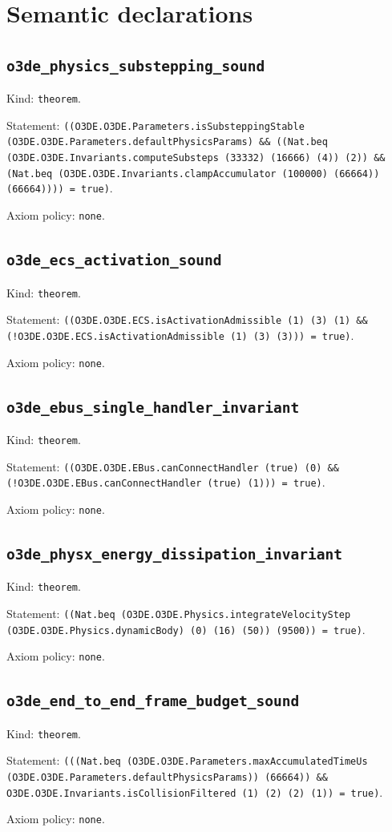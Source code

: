 \documentclass[11pt]{article}
\begin{document}
\section*{Semantic declarations}
\subsection*{\texttt{o3de\_physics\_substepping\_sound}}
\noindent Kind: \texttt{theorem}.\par
\noindent Statement: \texttt{((O3DE.O3DE.Parameters.isSubsteppingStable (O3DE.O3DE.Parameters.defaultPhysicsParams) \&\& ((Nat.beq (O3DE.O3DE.Invariants.computeSubsteps (33332) (16666) (4)) (2)) \&\& (Nat.beq (O3DE.O3DE.Invariants.clampAccumulator (100000) (66664)) (66664)))) = true)}.\par
\noindent Axiom policy: \texttt{none}.\par
\subsection*{\texttt{o3de\_ecs\_activation\_sound}}
\noindent Kind: \texttt{theorem}.\par
\noindent Statement: \texttt{((O3DE.O3DE.ECS.isActivationAdmissible (1) (3) (1) \&\& (!O3DE.O3DE.ECS.isActivationAdmissible (1) (3) (3))) = true)}.\par
\noindent Axiom policy: \texttt{none}.\par
\subsection*{\texttt{o3de\_ebus\_single\_handler\_invariant}}
\noindent Kind: \texttt{theorem}.\par
\noindent Statement: \texttt{((O3DE.O3DE.EBus.canConnectHandler (true) (0) \&\& (!O3DE.O3DE.EBus.canConnectHandler (true) (1))) = true)}.\par
\noindent Axiom policy: \texttt{none}.\par
\subsection*{\texttt{o3de\_physx\_energy\_dissipation\_invariant}}
\noindent Kind: \texttt{theorem}.\par
\noindent Statement: \texttt{((Nat.beq (O3DE.O3DE.Physics.integrateVelocityStep (O3DE.O3DE.Physics.dynamicBody) (0) (16) (50)) (9500)) = true)}.\par
\noindent Axiom policy: \texttt{none}.\par
\subsection*{\texttt{o3de\_end\_to\_end\_frame\_budget\_sound}}
\noindent Kind: \texttt{theorem}.\par
\noindent Statement: \texttt{(((Nat.beq (O3DE.O3DE.Parameters.maxAccumulatedTimeUs (O3DE.O3DE.Parameters.defaultPhysicsParams)) (66664)) \&\& O3DE.O3DE.Invariants.isCollisionFiltered (1) (2) (2) (1)) = true)}.\par
\noindent Axiom policy: \texttt{none}.\par
\end{document}
